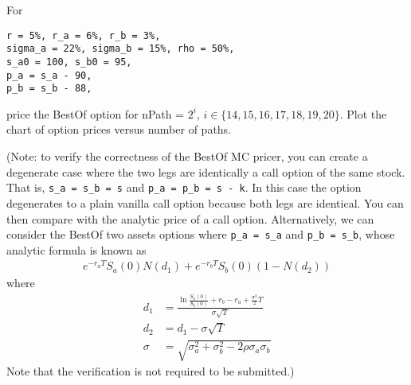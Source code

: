 \documentclass[11pt,a4paper,hidelinks,fleqn]{article}            %
\begin{document}
For
\begin{verbatim}
r = 5%, r_a = 6%, r_b = 3%,
sigma_a = 22%, sigma_b = 15%, rho = 50%,
s_a0 = 100, s_b0 = 95,
p_a = s_a - 90,
p_b = s_b - 88,
\end{verbatim}
price the BestOf option for nPath = $2^i$, $i \in \{14, 15, 16, 17, 18, 19, 20\}$. Plot the chart of option prices versus number of paths.

(Note: to verify the correctness of the BestOf MC pricer, you can create a degenerate case where the two legs are identically a call option of the same stock.
That is, \verb|s_a = s_b = s| and \verb|p_a = p_b = s - k|. In this case the option degenerates to a plain vanilla call option because both legs are identical.
You can then compare with the analytic price of a call option. 
Alternatively, we can consider the BestOf two assets options where \verb|p_a = s_a| and \verb|p_b = s_b|, whose analytic formula is known as
\begin{align*}
e^{-r_aT}S_{a}(0)N(d_1) + e^{-r_bT}S_{b}(0)(1 - N(d_2))
\end{align*}
where 
\begin{align*}
d_1 & = \frac{\ln{\frac{S_a(0)}{S_b(0)}} + r_b - r_a + \frac{\sigma^2}{2}T}{\sigma\sqrt{T}} \\
d_2 & = d_1 - \sigma \sqrt{T} \\
\sigma & = \sqrt{\sigma_a^2 + \sigma_b^2 - 2 \rho \sigma_a \sigma_b}
\end{align*}
Note that the verification is not required to be submitted.)
\end{document}
